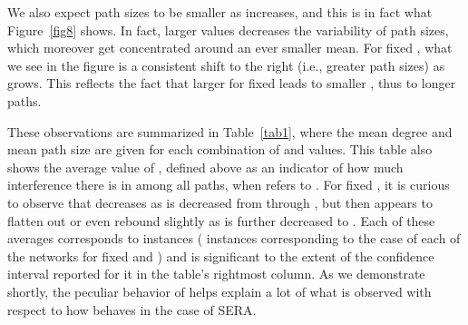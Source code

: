\documentclass{article}
\begin{document}
We also expect path sizes to be smaller as  increases, and this is in
fact what Figure~\ref{fig8} shows. In fact, larger  values decreases
the variability of path sizes, which moreover get concentrated around an ever
smaller mean. For fixed , what we see in the figure is a consistent
shift to the right (i.e., greater path sizes) as  grows. This reflects the
fact that larger  for fixed  leads to smaller , thus to longer
paths.

These observations are summarized in Table~\ref{tab1}, where the mean degree
and mean path size are given for each combination of  and  values.
This table also shows the average value of , defined above as an
indicator of how much interference there is in  among all  paths, when 
refers to . For fixed , it is curious to observe that 
decreases as  is decreased from  through , but then appears to
flatten out or even rebound slightly as  is further decreased to .
Each of these averages corresponds to   instances ( instances
corresponding to the  case of each of the  networks for fixed 
and ) and is significant to the extent of the confidence interval
reported for it in the table's rightmost column. As we demonstrate shortly, the
peculiar behavior of  helps explain a lot of what is observed with
respect to how  behaves in the case of SERA.
\end{document}
